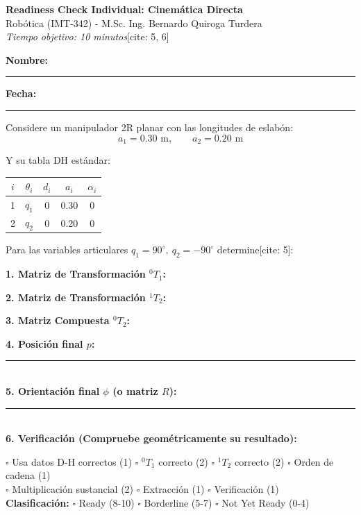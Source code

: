 \documentclass[11pt, a4paper]{article}
\begin{document}
\begin{center}
    \Large\textbf{\textcolor{ucbblue}{Readiness Check Individual: Cinemática Directa}}\\[0.2cm]
    \normalsize Robótica (IMT-342) - M.Sc. Ing. Bernardo Quiroga Turdera\\[0.1cm]
    \textit{Tiempo objetivo: 10 minutos}[cite: 5, 6]
\end{center}

\vspace{0.4cm}
\textbf{Nombre:} \rule{8cm}{0.15mm} \hfill \textbf{Fecha:} \rule{4cm}{0.15mm}

\vspace{0.6cm}
Considere un manipulador 2R planar con las longitudes de eslabón:
\begin{equation*}
    a_1 = 0.30\text{ m}, \qquad a_2 = 0.20\text{ m}
\end{equation*}

Y su tabla DH estándar:
\begin{center}
    \begin{tabular}{c c c c c}
    \toprule
    $i$ & $\theta_i$ & $d_i$ & $a_i$ & $\alpha_i$ \\ \midrule
    1 & $q_1$ & 0 & 0.30 & 0 \\
    2 & $q_2$ & 0 & 0.20 & 0 \\ \bottomrule
    \end{tabular}
\end{center}

Para las variables articulares $q_1=90^\circ, \ q_2=-90^\circ$ determine[cite: 5]:

\vspace{0.4cm}
\noindent \textbf{1. Matriz de Transformación ${}^0T_1$:}
\vspace{2.5cm}

\noindent \textbf{2. Matriz de Transformación ${}^1T_2$:}
\vspace{2.5cm}

\noindent \textbf{3. Matriz Compuesta ${}^0T_2$:}
\vspace{3.5cm}

\noindent \textbf{4. Posición final $p$:} \rule{6cm}{0.15mm} \\[0.8cm]
\noindent \textbf{5. Orientación final $\phi$ (o matriz $R$):} \rule{6cm}{0.15mm} \\[0.8cm]
\noindent \textbf{6. Verificación (Compruebe geométricamente su resultado):} 

\vfill
\begin{tcolorbox}[colback=gray!10, colframe=gray!50, title=\textbf{Uso Exclusivo del Docente - Scoring[cite: 5]}]
    \small
    $\square$ Usa datos D-H correctos (1) \quad 
    $\square$ ${}^0T_1$ correcto (2) \quad 
    $\square$ ${}^1T_2$ correcto (2) \quad 
    $\square$ Orden de cadena (1) \\
    $\square$ Multiplicación sustancial (2) \quad
    $\square$ Extracción (1) \quad
    $\square$ Verificación (1) \\
    \textbf{Clasificación:} $\square$ Ready (8-10) \quad $\square$ Borderline (5-7) \quad $\square$ Not Yet Ready (0-4)
\end{tcolorbox}
\end{document}
